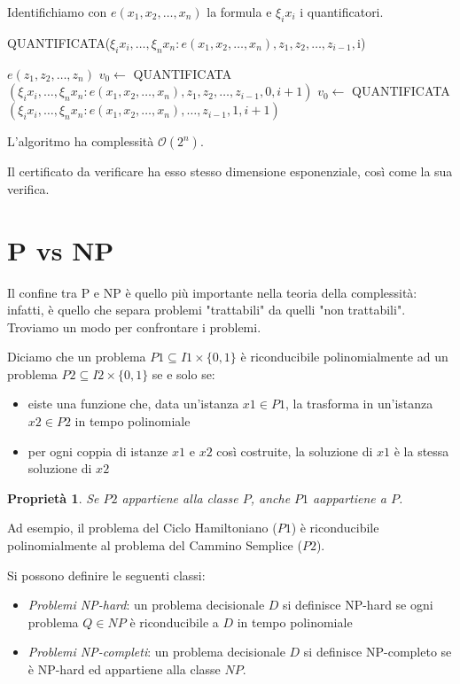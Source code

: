 \documentclass[11pt]{book}
\newtheorem*{proprietà}{Proprietà}
\begin{document}
Identifichiamo con $e(x_1,x_2,\dots,x_n)$ la formula e $\xi_i x_i$ i quantificatori.
\begin{algorithm}[H]
    \caption{QUANTIFICATA($\xi_i x_i,\dots,\xi_n x_n:e(x_1,x_2,\dots,x_n),z_1,z_2,\dots,z_{i-1},$i)}
    \begin{algorithmic}
        \Return $e(z_1,z_2,\dots,z_n)$
        \Else 
            \State $v_0\gets$ QUANTIFICATA $(\xi_i x_i,\dots,\xi_n x_n:e(x_1,x_2,\dots,x_n),z_1,z_2,\dots,z_{i-1},0,i+1)$
            \State $v_0\gets$ QUANTIFICATA $(\xi_i x_i,\dots,\xi_n x_n:e(x_1,x_2,\dots,x_n),\dots,z_{i-1},1,i+1)$
            \Else{}
            \EndIf
        \EndIf
    \end{algorithmic}
\end{algorithm} 
L'algoritmo ha complessità $\mathcal{O}(2^n)$.

Il certificato da verificare ha esso stesso dimensione esponenziale, così come la sua verifica.
\section{P vs NP}
Il confine tra P e NP è quello più importante nella teoria della complessità: infatti, è quello che separa problemi "trattabili"
da quelli "non trattabili". Troviamo un modo per confrontare i problemi.

Diciamo che un problema $P1\subseteq I1\times\{0,1\}$ è riconducibile polinomialmente ad un problema $P2\subseteq I2\times\{0,1\}$
se e solo se:
\begin{itemize}
    \item eiste una funzione che, data un'istanza $x1\in P1$, la trasforma in un'istanza $x2\in P2$ in tempo polinomiale 
    \item per ogni coppia di istanze $x1$ e $x2$ così costruite, la soluzione di $x1$ è la stessa soluzione di $x2$
\end{itemize}
\begin{proprietà}
    Se $P2$ appartiene alla classe $P$, anche $P1$ aappartiene a $P$.
\end{proprietà}
Ad esempio, il problema del Ciclo Hamiltoniano ($P1$) è riconducibile polinomialmente al problema del Cammino Semplice ($P2$).

Si possono definire le seguenti classi:
\begin{itemize}
    \item \textit{Problemi NP-hard}: un problema decisionale $D$ si definisce NP-hard se ogni problema $Q\in NP$ è riconducibile
    a $D$ in tempo polinomiale 
    \item \textit{Problemi NP-completi}: un problema decisionale $D$ si definisce NP-completo se è NP-hard ed appartiene 
    alla classe $NP$.
\end{itemize}
\end{document}
